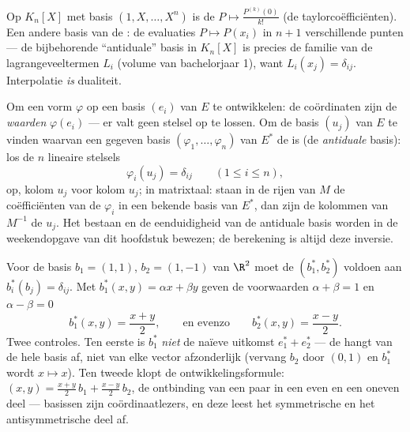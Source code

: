 \begin{example}\label{ex:b2:linalg:dualexamples}
Op $K_n[X]$ met basis $(1, X, \dots, X^n)$ is de  $P
\mapsto \frac{P^{(k)}(0)}{k!}$ (de taylorcoëfficiënten). Een andere
basis van de : de evaluaties $P \mapsto P(x_i)$ in $n +
1$ verschillende punten --- de bijbehorende ``antiduale'' basis in
$K_n[X]$ is precies de familie van de lagrangeveeltermen $L_i$
(volume van bachelorjaar 1), want $L_i(x_j) = \delta_{ij}$.
Interpolatie \emph{is} dualiteit.
\end{example}

\begin{method}\label{met:b2:linalg:dualbasis}
Om een vorm $\varphi$ op een basis $(e_i)$ van $E$ te ontwikkelen:
de coördinaten zijn de \emph{waarden} $\varphi(e_i)$ --- er valt
geen stelsel op te lossen. Om de basis $(u_j)$ van $E$ te vinden
waarvan een gegeven basis $(\varphi_1, \dots, \varphi_n)$ van
$E^*$ de  is (de \emph{antiduale} basis): los de $n$ lineaire
stelsels
\[
\varphi_i(u_j) = \delta_{ij} \qquad (1 \leq i \leq n),
\]
op, kolom $u_j$ voor kolom $u_j$; in matrixtaal: staan in de rijen
van $M$ de coëfficiënten van de $\varphi_i$ in een bekende basis
van $E^*$, dan zijn de kolommen van $M^{-1}$ de $u_j$. Het bestaan
en de eenduidigheid van de antiduale basis worden in de
weekendopgave van dit hoofdstuk bewezen; de berekening is altijd
deze inversie.
\end{method}

\begin{example}\label{ex:b2:linalg:dualbasis2d}
Voor de basis $b_1 = (1, 1)$, $b_2 = (1, -1)$ van $\R^2$ moet de
 $(b_1^*, b_2^*)$ voldoen aan $b_i^*(b_j) =
\delta_{ij}$. Met $b_1^*(x, y) = \alpha x + \beta y$ geven de
voorwaarden $\alpha + \beta = 1$ en $\alpha - \beta = 0$
\[
b_1^*(x, y) = \frac{x + y}{2},
\qquad\text{en evenzo}\qquad
b_2^*(x, y) = \frac{x - y}{2} .
\]
Twee controles. Ten eerste is $b_1^*$ \emph{niet} de naïeve
uitkomst $e_1^* + e_2^*$ --- de  hangt van de hele
basis af, niet van elke vector afzonderlijk (vervang $b_2$ door
$(0, 1)$ en $b_1^*$ wordt $x \mapsto x$). Ten tweede klopt de
ontwikkelingsformule: $(x, y) = \frac{x+y}2\,b_1 +
\frac{x-y}2\,b_2$, de ontbinding van een paar in een even en een
oneven deel ---  basissen zijn coördinaatlezers, en deze leest
het symmetrische en het antisymmetrische deel af.
\end{example}

